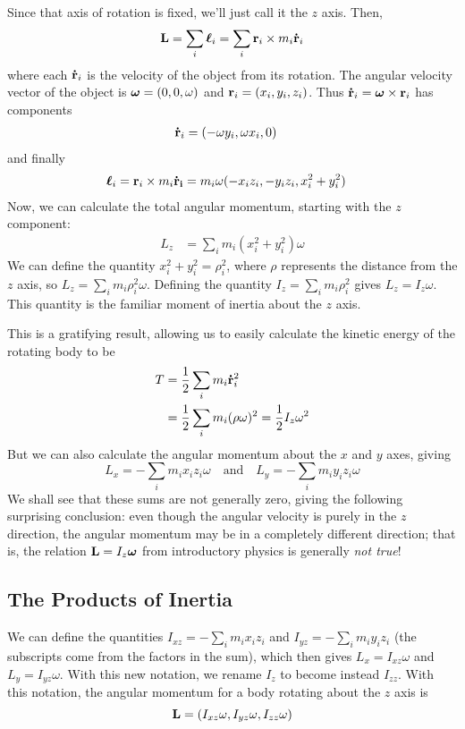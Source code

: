 Since that axis of rotation is fixed, we'll just call it the $z$ axis. Then,
\[ \mathbf{L} = \sum_i \boldsymbol{\ell}_i = \sum_i \mathbf{r}_i \times m_i\mathbf{\dot r}_i\]
where each $\mathbf{\dot r}_i$ is the velocity of the object from its rotation. The angular velocity vector of the object is $\boldsymbol{\omega} = (0,0,\omega)$ and $\mathbf{r}_i = (x_i,y_i,z_i)$. Thus $\mathbf{\dot r}_i = \boldsymbol{\omega} \times\mathbf{r}_i$ has components
\begin{align*}
    \mathbf{\dot r}_i &= (-\omega y_i, \omega x_i, 0)
\end{align*}
and finally
\begin{align*}
    \boldsymbol{\ell}_i = \mathbf{r}_i \times m_i\mathbf{\dot r_i} &= m_i\omega (-x_iz_i, -y_iz_i,x_i^2+y_i^2)
\end{align*}
Now, we can calculate the total angular momentum, starting with the $z$ component:
\begin{align*}
    L_z &= \sum_i m_i(x_i^2+y_i^2)\omega
\end{align*}
We can define the quantity $x_i^2+y_i^2=\rho_i^2$, where $\rho$ represents the distance from the $z$ axis, so $L_z = \sum_i m_i\rho_i^2\omega$. Defining the quantity $I_z = \sum_i m_i\rho_i^2$ gives $L_z = I_z\omega$. This quantity is the familiar moment of inertia about the $z$ axis.

This is a gratifying result, allowing us to easily calculate the kinetic energy of the rotating body to be
\begin{align*}
    T &= \frac{1}{2}\sum_i m_i\mathbf{\dot r}_i^2 \\
    &= \frac{1}{2}\sum_i m_i (\rho \omega)^2 = \frac{1}{2}I_z\omega^2
\end{align*}
But we can also calculate the angular momentum about the $x$ and $y$ axes, giving
\[ L_x = -\sum_i m_ix_iz_i \omega \quad\text{and}\quad L_y = -\sum_i m_iy_iz_i\omega \]
We shall see that these sums are not generally zero, giving the following surprising conclusion: even though the angular velocity is purely in the $z$ direction, the angular momentum may be in a completely different direction; that is, the relation $\mathbf{L} = I_z\boldsymbol{\omega}$ from introductory physics is generally \textit{not true}! 
\subsection*{The Products of Inertia}
We can define the quantities $I_{xz} = -\sum_i m_ix_iz_i$ and $I_{yz} = -\sum_i m_iy_iz_i$ (the subscripts come from the factors in the sum), which then gives $L_x = I_{xz}\omega$ and $L_y = I_{yz}\omega$. With this new notation, we rename $I_z$ to become instead $I_{zz}$. With this notation, the angular momentum for a body rotating about the $z$ axis is
\[ \mathbf{L} = (I_{xz}\omega, I_{yz}\omega, I_{zz}\omega)\]
